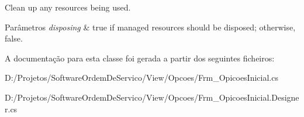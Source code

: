 Clean up any resources being used. 


\begin{DoxyParams}{Parâmetros}
{\em disposing} & true if managed resources should be disposed; otherwise, false.\\
\hline
\end{DoxyParams}


A documentação para esta classe foi gerada a partir dos seguintes ficheiros\+:\begin{DoxyCompactItemize}
\item 
D\+:/\+Projetos/\+Software\+Ordem\+De\+Servico/\+View/\+Opcoes/Frm\+\_\+\+Opicoes\+Inicial.\+cs\item 
D\+:/\+Projetos/\+Software\+Ordem\+De\+Servico/\+View/\+Opcoes/Frm\+\_\+\+Opicoes\+Inicial.\+Designer.\+cs\end{DoxyCompactItemize}
